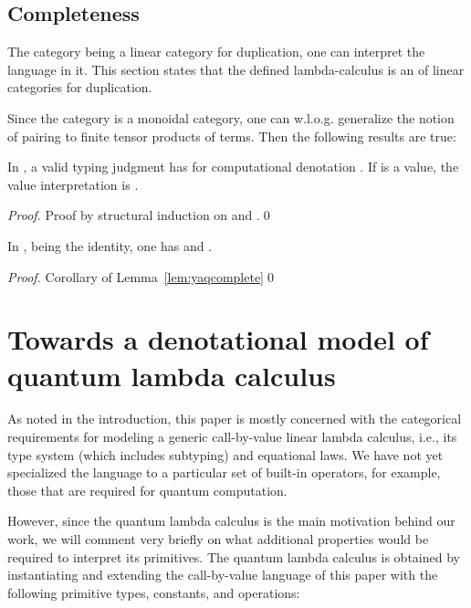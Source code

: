 \documentclass{llncs}
\begin{document}
\subsection{Completeness}


The category  being a linear category for duplication, one
can interpret the language in it. This section states that the defined
lambda-calculus is an  of linear categories
for duplication.


Since the category  is a monoidal category, one can
w.l.o.g. generalize the notion of pairing to finite tensor products of
terms. Then the following results are true:



\begin{lemma}\label{lem:yaqcomplete}
  In , a valid typing judgment  has for computational denotation
  . If  is a value, the value
  interpretation is
  .
\end{lemma}

\begin{proof}
  Proof by structural induction on  and .\qed
\end{proof}

\begin{theorem}
  In ,  being the identity, one has
   and
  .
\end{theorem}

\begin{proof}
  Corollary of Lemma~\ref{lem:yaqcomplete}\qed
\end{proof}

\section{Towards a denotational model of quantum lambda calculus}

As noted in the introduction, this paper is mostly concerned with the
categorical requirements for modeling a generic call-by-value linear
lambda calculus, i.e., its type system (which includes subtyping) and
equational laws. We have not yet specialized the language to a
particular set of built-in operators, for example, those that are
required for quantum computation.

However, since the quantum lambda calculus {\cite{selinger05lambda}}
is the main motivation behind our work, we will comment very briefly
on what additional properties would be required to interpret its
primitives. The quantum lambda calculus is obtained by instantiating
and extending the call-by-value language of this paper with the
following primitive types, constants, and operations:
\end{document}
